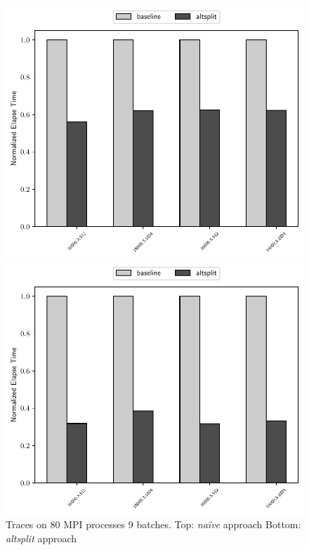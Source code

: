 \begin{figure}[H]
    \centerline{\includegraphics[scale=0.30]{altsplit/figs/mn4/16000_avgs_320.pdf}}
    \centerline{\includegraphics[scale=0.30]{altsplit/figs/mn4/16000_avgs_640.pdf}}
    \caption{Traces on 80 MPI processes 9 batches. Top: \emph{na\"{i}ve} approach Bottom: \emph{altsplit} approach}
    \label{fig:altsplit_traces}
\end{figure}

